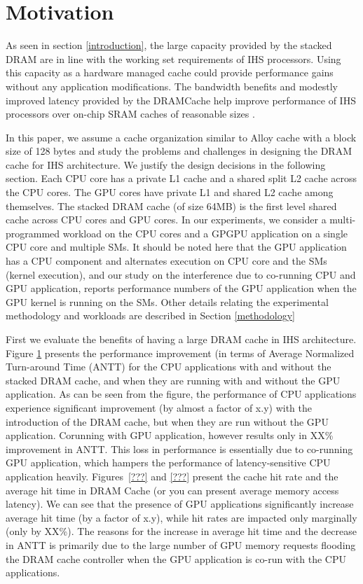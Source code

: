 \section{Motivation} \label{motivation}
As seen in section \ref{introduction}, the large capacity provided by the stacked DRAM are in line with the working set requirements of IHS processors. Using this capacity as a hardware managed cache could provide performance gains without any application modifications. The bandwidth benefits and modestly improved latency provided by the DRAMCache help improve performance of IHS processors over on-chip SRAM caches of reasonable sizes \cite{amd-exascale1}. 

In this paper, we assume a cache organization similar to Alloy cache \cite{alloy} with a block size of 128 bytes and study the problems and challenges in designing the DRAM cache for IHS architecture. We justify the design decisions in the following section. 
Each CPU core has a private L1 cache and a shared split L2 cache across the CPU cores. The GPU cores have private L1 and shared L2 cache among themselves.  
The stacked DRAM cache (of size 64MB) is the first level shared cache across CPU cores and GPU cores. In our experiments, we consider a multi-programmed workload on the CPU cores and a GPGPU application on a single CPU core and multiple SMs. It should be noted here that the GPU application has a CPU component and alternates execution on CPU core and the SMs (kernel execution), and our study on the interference due to co-running CPU and GPU application, reports performance numbers of the GPU application when the GPU kernel is running on the SMs.  
Other details relating the experimental methodology and workloads are described in Section \ref{methodology}

First we evaluate the benefits of having a large DRAM cache in IHS architecture. Figure \ref{motivation} presents the performance
improvement (in terms of Average Normalized Turn-around Time (ANTT) \cite{antt} for the CPU applications with and without
the stacked DRAM cache, and when they are running with and without the GPU application. As can be seen from the figure,
the performance of CPU applications experience significant improvement (by almost a factor of x.y) with the introduction 
of the DRAM cache, but when they are run without the GPU application. Corunning with GPU application, however results
only in XX\% improvement in ANTT. This loss in performance is essentially due to co-running GPU application, which hampers
the performance of latency-sensitive CPU application heavily. Figures~\ref{???} and \ref{???} present the cache hit rate
and the average hit time in DRAM Cache (or you can present average memory access latency).  We can see that the presence
of GPU applications significantly increase average hit time (by a factor of x.y), while hit rates are impacted only marginally 
(only by XX\%). The reasons for the increase in average hit time and the decrease in ANTT is primarily due to the large
number of GPU memory requests flooding the DRAM cache controller when the GPU application is co-run with the CPU applications.

